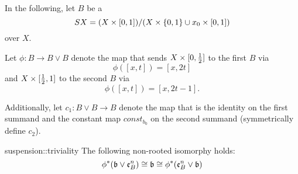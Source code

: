 \begin{myparagraph}
    In the following, let $B$ be a 
    \[ SX = (X \times{} [0, 1]) / (X \times \{0, 1\} \cup x_0 \times{} [0, 1])\]
    over $X$.

    Let $\phi: B \to B \vee B$ denote the map that sends
    $X \times [0, \frac{1}{2}]$ to the first $B$ via
    \[ \phi([x, t]) = [x, 2t] \]
    and $X \times [\frac{1}{2}, 1]$ to the second $B$ via
    \[ \phi([x, t]) = [x, 2t - 1]. \]

    Additionally, let $c_1: B \vee B \to B$ denote the map
    that is the identity on the first summand
    and the constant map $const_{b_0}$ on the second summand (symmetrically define $c_2$).
\end{myparagraph}

\begin{mylemma}{suspension::triviality}
    The following non-rooted isomorphy holds:
    \[ \phi^*(\mathfrak{b} \vee \mathfrak{e}^{n}_{B}) \cong \mathfrak{b} \cong \phi^*(\mathfrak{e}^{n}_{B} \vee \mathfrak{b}) \]
\end{mylemma}
